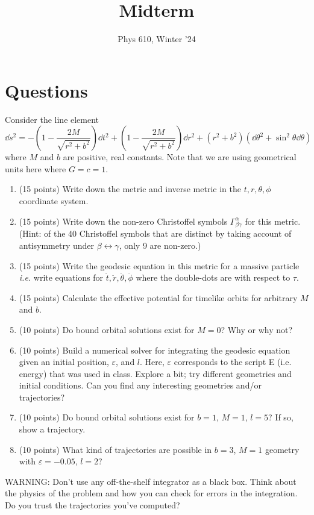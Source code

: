 \documentclass[12pt]{article}
\newcommand{\chrissym}[3]{\Gamma_{#2#3}^#1}
\begin{document}
\title{Midterm}
\author{Phys 610, Winter '24}
\maketitle

\section*{Questions}
Consider the line element
\[ \dd s^2 = -\left(1 - \frac{2M}{\sqrt{r^2 + b^2}}\right)\dd t^2 + \left(1 - \frac{2M}{\sqrt{r^2 + b^2}}\right)\dd r^2 + (r^2 + b^2)(\dd\theta^2 + \sin^2\theta\dd\theta) \]
where $M$ and $b$ are positive, real constants. Note that we are using geometrical units here where $G = c = 1$.
\begin{enumerate}
    \item (15 points) Write down the metric and inverse metric in the $t, r, \theta, \phi$ coordinate system.

    \item (15 points) Write down the non-zero Christoffel symbols $\chrissym{\alpha}{\beta}{\gamma}$ for this metric. (Hint: of the 40 Christoffel symbols that are distinct by taking account of antisymmetry under $\beta \leftrightarrow \gamma$, only 9 are non-zero.)

    \item (15 points) Write the geodesic equation in this metric for a massive particle \textit{i.e.} write equations for $\ddot{t}, \ddot{r}, \ddot{\theta}, \ddot{\phi}$ where the double-dots are with respect to $\tau$.

    \item (15 points) Calculate the effective potential for timelike orbits for arbitrary $M$ and $b$.

    \item (10 points) Do bound orbital solutions exist for $M = 0$? Why or why not?
    
    \item (10 points) Build a numerical solver for integrating the geodesic equation given an initial position, $\varepsilon$, and $l$. Here, $\varepsilon$ corresponds to the script E (i.e. energy) that was used in class. Explore a bit; try different geometries and initial conditions. Can you find any interesting geometries and/or trajectories?
    
    \item (10 points) Do bound orbital solutions exist for $b=1$, $M=1$, $l=5$? If so, show a trajectory.
    
    \item (10 points) What kind of trajectories are possible in $b=3$, $M=1$ geometry with $\varepsilon=-0.05$, $l=2$?
\end{enumerate}
WARNING: Don't use any off-the-shelf integrator as a black box.  Think about the physics of the problem and how you can check for errors in the integration.  Do you trust the trajectories you've computed?
\end{document}
